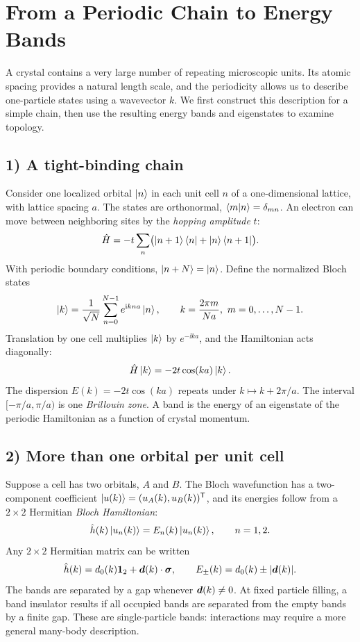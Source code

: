 \section{From a Periodic Chain to Energy Bands}
A crystal contains a very large number of repeating microscopic units. Its atomic spacing provides a natural length scale, and the periodicity allows us to describe one-particle states using a wavevector $k$. We first construct this description for a simple chain, then use the resulting energy bands and eigenstates to examine topology.

\subsection*{1) A tight-binding chain}
Consider one localized orbital $\left|n\right\rangle$ in each unit cell $n$ of a one-dimensional lattice, with lattice spacing $a$. The states are orthonormal, $\left\langle m\middle|n\right\rangle=\delta_{mn}$. An electron can move between neighboring sites by the \emph{hopping amplitude} $t$:
\begin{equation}
 \hat{H}=-t\sum_n\bigl(\left|n+1\right\rangle\left\langle n\right|+\left|n\right\rangle\left\langle n+1\right|\bigr).
\end{equation}
With periodic boundary conditions, $\left|n+N\right\rangle=\left|n\right\rangle$. Define the normalized Bloch states
\begin{equation}
\left|k\right\rangle=\frac1{\sqrt N}\sum_{n=0}^{N-1}e^{\mathrm{i} kna}\left|n\right\rangle,
\qquad k=\frac{2\pi m}{Na},\ m=0,\ldots,N-1.
\end{equation}
Translation by one cell multiplies $\left|k\right\rangle$ by $e^{-\ii ka}$, and the Hamiltonian acts diagonally:
\begin{equation}
 \hat{H}\left|k\right\rangle=-2t\cos(ka)\left|k\right\rangle.
\end{equation}
The dispersion $E(k)=-2t\cos(ka)$ repeats under $k\mapsto k+2\pi/a$. The interval $[-\pi/a,\pi/a)$ is one \emph{Brillouin zone}. A band is the energy of an eigenstate of the periodic Hamiltonian as a function of crystal momentum.

\subsection*{2) More than one orbital per unit cell}
Suppose a cell has two orbitals, $A$ and $B$. The Bloch wavefunction has a two-component coefficient $\left|u(k)\right\rangle=(u_A(k),u_B(k))^{\mathsf T}$, and its energies follow from a $2\times2$ Hermitian \emph{Bloch Hamiltonian}:
\begin{equation}
 \hat{h}(k)\left|u_n(k)\right\rangle=E_n(k)\left|u_n(k)\right\rangle,\qquad n=1,2.
\end{equation}
Any $2\times2$ Hermitian matrix can be written
\begin{equation}
 \hat{h}(k)=d_0(k)\mathbf1_2+\bm{d}(k)\cdot\bm{\sigma},\qquad
 E_\pm(k)=d_0(k)\pm|\bm{d}(k)|.
\end{equation}
The bands are separated by a gap whenever $\bm{d}(k)\ne0$. At fixed particle filling, a band insulator results if all occupied bands are separated from the empty bands by a finite gap. These are single-particle bands: interactions may require a more general many-body description.

